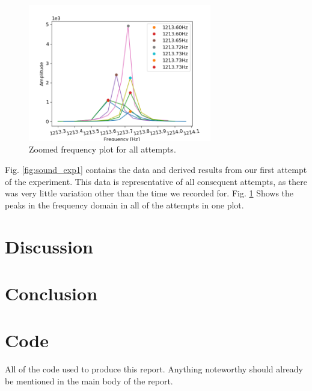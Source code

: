 \documentclass[%
 reprint,
 amsmath,amssymb,
 aps,
]{revtex4-1}
\begin{document}
    \begin{figure}[h!]
      \centering 
      \includegraphics[width=8cm]{scripts/freq_exp2_all.png}
      \caption{Zoomed frequency plot for all attempts.}
      \label{fig:sound_all}
    \end{figure}

    Fig. \ref{fig:sound_exp1} contains the data and derived results from our first attempt of the experiment. This data is representative of all consequent attempts, as there was very little variation other than the time we recorded for. Fig. \ref{fig:sound_all} Shows the peaks in the frequency domain in all of the attempts in one plot. 

\newpage
\section{\label{sect:discussion}Discussion}
 
\section{\label{sect:conclusion}Conclusion}





\onecolumngrid %
\newpage %
\appendix*
\section{Code}
All of the code used to produce this report. Anything noteworthy should already be mentioned in the main body of the report.




\twocolumngrid %
\end{document}
